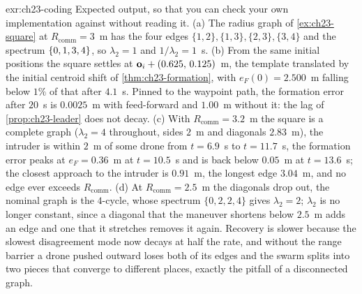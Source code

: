 \begin{solution}{exr:ch23-coding}
Expected output, so that you can check your own implementation against
 without reading it.
(a) The radius graph of \cref{ex:ch23-square} at $R_{\mathrm{comm}}=3$~m has the four edges $\{1,2\},\{1,3\},\{2,3\},\{3,4\}$ and the spectrum $\left\{ 0,1,3,4 \right\}$, so $\lambda_2=1$ and $1/\lambda_2=1$~s.
(b) From the same initial positions the square settles at $\mathbf{o}_i+(0.625,\,0.125)$~m, the template translated by the initial centroid shift of \cref{thm:ch23-formation}, with $e_F(0)=2.500$~m falling below $1\%$ of that after $4.1$~s. Pinned to the waypoint path, the formation error after $20$~s is $0.0025$~m with feed-forward and $1.00$~m without it: the lag of \cref{prop:ch23-leader} does not decay.
(c) With $R_{\mathrm{comm}}=3.2$~m the square is a complete graph ($\lambda_2=4$ throughout, sides $2$~m and diagonals $2.83$~m), the intruder is within $2$~m of some drone from $t=6.9$~s to $t=11.7$~s, the formation error peaks at $e_F=0.36$~m at $t=10.5$~s and is back below $0.05$~m at $t=13.6$~s; the closest approach to the intruder is $0.91$~m, the longest edge $3.04$~m, and no edge ever exceeds $R_{\mathrm{comm}}$.
(d) At $R_{\mathrm{comm}}=2.5$~m the diagonals drop out, the nominal graph is the $4$-cycle, whose spectrum $\{0,2,2,4\}$ gives $\lambda_2=2$; $\lambda_2$ is no longer constant, since a diagonal that the maneuver shortens below $2.5$~m adds an edge and one that it stretches removes it again. Recovery is slower because the slowest disagreement mode now decays at half the rate, and without the range barrier a drone pushed outward loses both of its edges and the swarm splits into two pieces that converge to different places, exactly the pitfall of a disconnected graph.
\end{solution}
